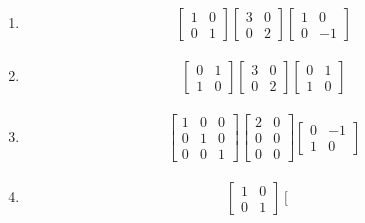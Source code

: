 \documentclass[a4paper,oneside]{book}
\numberwithin{equation}{chapter}
\begin{document}
\begin{enumerate}
\item 
\begin{align}
\left[ {\begin{array}{*{20}{c}}
1&0\\
0&1
\end{array}} \right]\left[ {\begin{array}{*{20}{c}}
3&0\\
0&2
\end{array}} \right]\left[ {\begin{array}{*{20}{c}}
1&0\\
0&{ - 1}
\end{array}} \right]
\end{align}
\item 
\begin{align}
\left[ {\begin{array}{*{20}{c}}
0&1\\
1&0
\end{array}} \right]\left[ {\begin{array}{*{20}{c}}
3&0\\
0&2
\end{array}} \right]\left[ {\begin{array}{*{20}{c}}
0&1\\
1&0
\end{array}} \right]
\end{align}
\item
\begin{align}
\left[ {\begin{array}{*{20}{c}}
1&0&0\\
0&1&0\\
0&0&1
\end{array}} \right]\left[ {\begin{array}{*{20}{c}}
2&0\\
0&0\\
0&0
\end{array}} \right]\left[ {\begin{array}{*{20}{c}}
0&{ - 1}\\
1&0
\end{array}} \right]
\end{align}
\item
\begin{align}
\left[ {\begin{array}{*{20}{c}}
1&0\\
0&1
\end{array}} \right]\left[ {\begin{array}{*{20}{c}}

\end{array}}
\end{align}
\end{enumerate}
\end{document}
